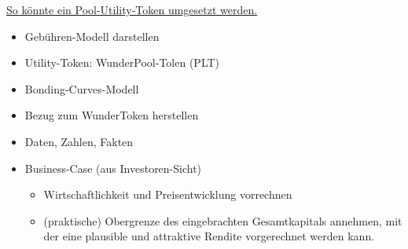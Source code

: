
\vspace{0.3cm}

\href{https://medium.com/atchai/can-we-save-the-utility-token-55ef639370cf}{So könnte ein Pool-Utility-Token umgesetzt werden.}

\vspace{0.3cm}

\begin{itemize}
	\item Gebühren-Modell darstellen
	\item Utility-Token: WunderPool-Tolen (PLT)
	\item Bonding-Curves-Modell
	\item Bezug zum WunderToken herstellen
	\item Daten, Zahlen, Fakten 
	\item Business-Case (aus Investoren-Sicht)
	\begin{itemize}
		\item Wirtschaftlichkeit und Preisentwicklung vorrechnen
		\item (praktische) Obergrenze des eingebrachten Gesamtkapitals annehmen, mit der eine plausible und attraktive Rendite vorgerechnet werden kann.
	\end{itemize}
\end{itemize}

\vspace{0.3cm}	




\vspace{0.5cm}

